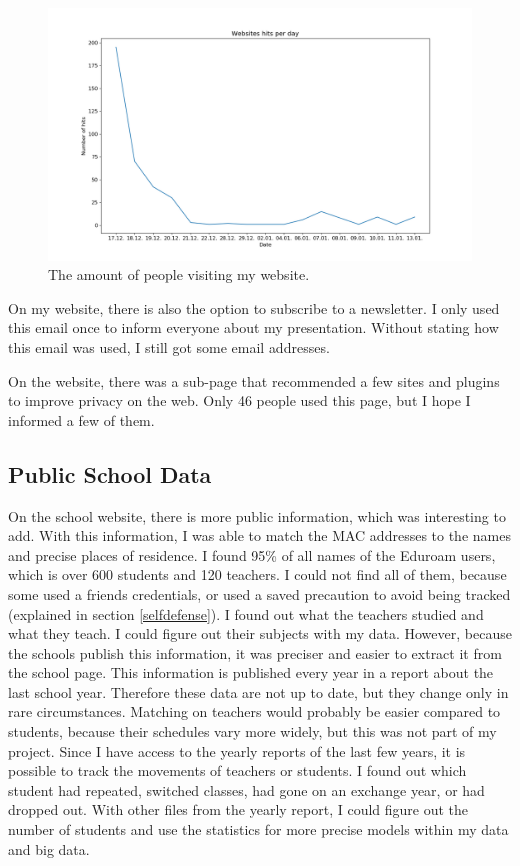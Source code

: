 \documentclass[paper=a4, fontsize=11pt]{article}
\begin{document}
\begin{figure}
\centering
\includegraphics [width = 14cm]{images/websitevisiting.png}
\caption{The amount of people visiting my website.\label{fig:visiting}}
\end{figure}

On my website, there is also the option to subscribe to a newsletter. I only used this email once to inform everyone about my presentation. Without stating how this email was used, I still got some email addresses.

On the website, there was a sub-page that recommended a few sites and plugins to improve privacy on the web. Only 46 people used this page, but I hope I informed a few of them.

\subsection{Public School Data}
On the school website, there is more public information, which was interesting to add. With this information, I was able to match the MAC addresses to the names and precise places of residence. I found 95\% of all names of the Eduroam users, which is over 600 students and 120 teachers. I could not find all of them, because some used a friends credentials, or used a saved precaution to avoid being tracked (explained in section \ref{selfdefense}). I found out what the teachers studied and what they teach. I could figure out their subjects with my data. However, because the schools publish this information, it was preciser and easier to extract it from the school page. This information is published every year in a report about the last school year. Therefore these data are not up to date, but they change only in rare circumstances. Matching on teachers would probably be easier compared to students, because their schedules vary more widely, but this was not part of my project. Since I have access to the yearly reports of the last few years, it is possible to track the movements of teachers or students. I found out which student had repeated, switched classes, had gone on an exchange year, or had dropped out. With other files from the yearly report, I could figure out the number of students and use the statistics for more precise models within my data and big data.
\end{document}
